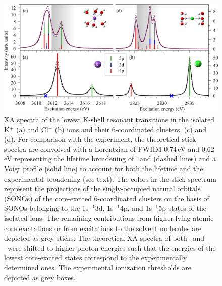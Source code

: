 

\begin{figure}[h!]
\centering
\includegraphics[scale=0.55]{figures/xas_spectra_jul12.eps}
\caption{XA spectra of the lowest K-shell resonant transitions in the isolated K$^{+}$ (a) and Cl$^{-}$ (b) ions and their 6-coordinated clusters, (c) and (d). For comparison with the experiment, the theoretical stick spectra are convolved with a Lorentzian of FWHM 0.74\,eV and 0.62\,eV representing the lifetime broadening of \ki~and \cli \citep{Krause79:329} (dashed lines) and a Voigt profile (solid line) to account for both the lifetime and the experimental broadening (see text). The colors in the stick spectrum represent the projections of the singly-occupied natural orbitals (SONOs) of the core-excited 6-coordinated clusters on the basis of SONOs belonging to the 1s$^{-1}$3d, 1s$^{-1}$4p, and 1s$^{-1}$5p states of the isolated ions. The remaining contributions from higher-lying atomic core excitations or from excitations to the solvent molecules are depicted as grey sticks. The theoretical XA spectra of both \ki~and \cli~were shifted to higher photon energies such that the energies of the lowest core-excited states correspond to the experimentally determined ones. The experimental ionization thresholds are depicted as grey boxes.}
\label{fg:xas_kcl}
\end{figure}

